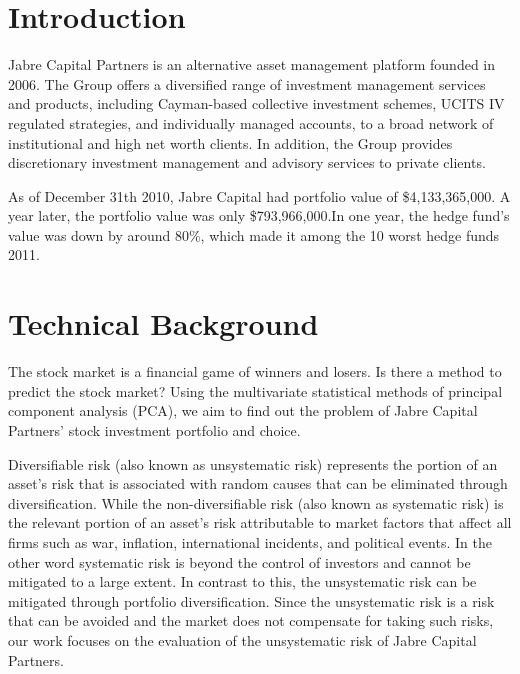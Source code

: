 \documentclass[oneside,12pt]{report}
\begin{document}
\listoftables


\renewcommand{\thefootnote}{\arabic{footnote}}
\setcounter{footnote}{0}


\chapter{Introduction}\label{Introduction}
Jabre Capital Partners is an alternative asset management platform founded in 2006. The Group offers a diversified range of investment management services and products, including Cayman-based collective investment schemes, UCITS IV regulated strategies, and individually managed accounts, to a broad network of institutional and high net worth clients. In addition, the Group provides discretionary investment management and advisory services to private clients.

As of December 31th 2010, Jabre Capital had portfolio value of \$4,133,365,000. A year later, the portfolio value was only \$793,966,000.In one year, the hedge fund's value was down by around 80\%, which made it among the 10 worst hedge funds 2011.   

\chapter{Technical Background}\label{Technical Background}
The stock market is a financial game of winners and losers. Is there a method to predict the stock market? Using the multivariate statistical methods of principal component analysis (PCA), we aim to find out the problem of Jabre Capital Partners’ stock investment portfolio and choice. 

Diversifiable risk (also known as unsystematic risk) represents the portion of an asset’s risk that is associated with random causes that can be eliminated through diversification. While the non-diversifiable risk (also known as systematic risk) is the relevant portion of an asset’s risk attributable to market factors that affect all firms such as war, inflation, international incidents, and political events. In the other word systematic risk is beyond the control of investors and cannot be mitigated to a large extent. In contrast to this, the unsystematic risk can be mitigated through portfolio diversification. Since the unsystematic risk is a risk that can be avoided and the market does not compensate for taking such risks, our work focuses on the evaluation of the unsystematic risk of Jabre Capital Partners.
\end{document}

